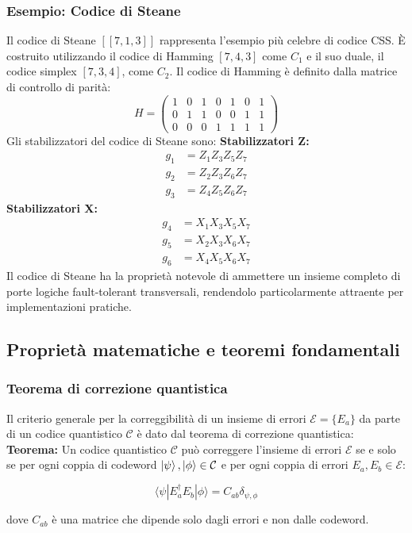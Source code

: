 \documentclass[a4paper,12pt]{report}
\theoremstyle{plain}
\begin{document}
\subsubsection{Esempio: Codice di Steane}
Il codice di Steane $[[7,1,3]]$ rappresenta l'esempio più celebre di codice CSS. È costruito utilizzando il codice di Hamming $[7,4,3]$ come $C_1$ e il suo duale, il codice simplex $[7,3,4]$, come $C_2$.
Il codice di Hamming è definito dalla matrice di controllo di parità:
\[
H = \begin{pmatrix}
1 & 0 & 1 & 0 & 1 & 0 & 1 \\
0 & 1 & 1 & 0 & 0 & 1 & 1 \\
0 & 0 & 0 & 1 & 1 & 1 & 1
\end{pmatrix}
\]
Gli stabilizzatori del codice di Steane sono:
\textbf{Stabilizzatori Z:}
\begin{align}
g_1 &= Z_1 Z_3 Z_5 Z_7 \\
g_2 &= Z_2 Z_3 Z_6 Z_7 \\
g_3 &= Z_4 Z_5 Z_6 Z_7
\end{align}
\textbf{Stabilizzatori X:}
\begin{align}
g_4 &= X_1 X_3 X_5 X_7 \\
g_5 &= X_2 X_3 X_6 X_7 \\
g_6 &= X_4 X_5 X_6 X_7
\end{align}
Il codice di Steane ha la proprietà notevole di ammettere un insieme completo di porte logiche fault-tolerant transversali, rendendolo particolarmente attraente per implementazioni pratiche.
\subsection{Proprietà matematiche e teoremi fondamentali}
\subsubsection{Teorema di correzione quantistica}
Il criterio generale per la correggibilità di un insieme di errori $\mathcal{E} = \{E_a\}$ da parte di un codice quantistico $\mathcal{C}$ è dato dal teorema di correzione quantistica:
\textbf{Teorema:} Un codice quantistico $\mathcal{C}$ può correggere l'insieme di errori $\mathcal{E}$ se e solo se per ogni coppia di codeword $\ket{\psi}, \ket{\phi} \in \mathcal{C}$ e per ogni coppia di errori $E_a, E_b \in \mathcal{E}$:

\[
\langle \psi | E_a^\dagger E_b | \phi \rangle = C_{ab} \delta_{\psi,\phi}
\]

dove $C_{ab}$ è una matrice che dipende solo dagli errori e non dalle codeword.
\end{document}
